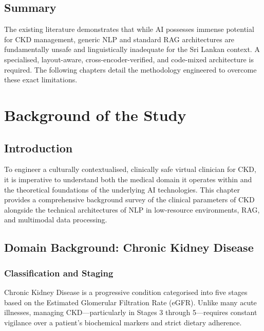 \documentclass[12pt,a4paper]{report}
\begin{document}
\section{Summary}

The existing literature demonstrates that while AI possesses immense potential for CKD management, generic NLP and standard RAG architectures are fundamentally unsafe and linguistically inadequate for the Sri Lankan context. A specialised, layout-aware, cross-encoder-verified, and code-mixed architecture is required. The following chapters detail the methodology engineered to overcome these exact limitations.

\chapter{Background of the Study}
\label{chap:background}

\section{Introduction}

To engineer a culturally contextualised, clinically safe virtual clinician for CKD, it is imperative to understand both the medical domain it operates within and the theoretical foundations of the underlying AI technologies. This chapter provides a comprehensive background survey of the clinical parameters of CKD alongside the technical architectures of NLP in low-resource environments, RAG, and multimodal data processing.

\section{Domain Background: Chronic Kidney Disease}

\subsection{Classification and Staging}

Chronic Kidney Disease is a progressive condition categorised into five stages based on the Estimated Glomerular Filtration Rate (eGFR). Unlike many acute illnesses, managing CKD---particularly in Stages 3 through 5---requires constant vigilance over a patient's biochemical markers and strict dietary adherence.
\end{document}
